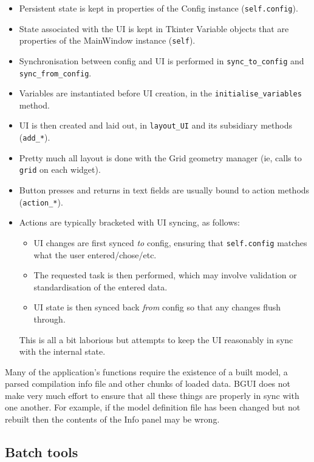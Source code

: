 \documentclass[a4paper,11pt]{article}
\begin{document}
\begin{itemize}
\item Persistent state is kept in properties of the Config instance (\texttt{self.config}).
\item State associated with the UI is kept in Tkinter Variable objects that are properties of the MainWindow instance (\texttt{self}).
\item Synchronisation between config and UI is performed in \texttt{sync\_to\_config} and \texttt{sync\_from\_config}.
\item Variables are instantiated before UI creation, in the \texttt{initialise\_variables} method.
\item UI is then created and laid out, in \texttt{layout\_UI} and its subsidiary methods (\texttt{add\_*}).
\item Pretty much all layout is done with the Grid geometry manager (ie, calls to \texttt{grid} on each widget).
\item Button presses and returns in text fields are usually bound to action methods (\texttt{action\_*}).
\item Actions are typically bracketed with UI syncing, as follows:
\begin{itemize}
\item UI changes are first synced \textit{to} config, ensuring that \texttt{self.config} matches what the user entered/chose/etc.
\item The requested task is then performed, which may involve validation or standardisation of the entered data.
\item UI state is then synced back \textit{from} config so that any changes flush through.
\end{itemize}
This is all a bit laborious but attempts to keep the UI reasonably in sync with the internal state.
\end{itemize}

Many of the application's functions require the existence of a built model, a parsed compilation info file and other chunks of loaded data. BGUI does not make very much effort to ensure that all these things are properly in sync with one another. For example, if the model definition file has been changed but not rebuilt then the contents of the Info panel may be wrong.

\subsection{Batch tools}
\end{document}
